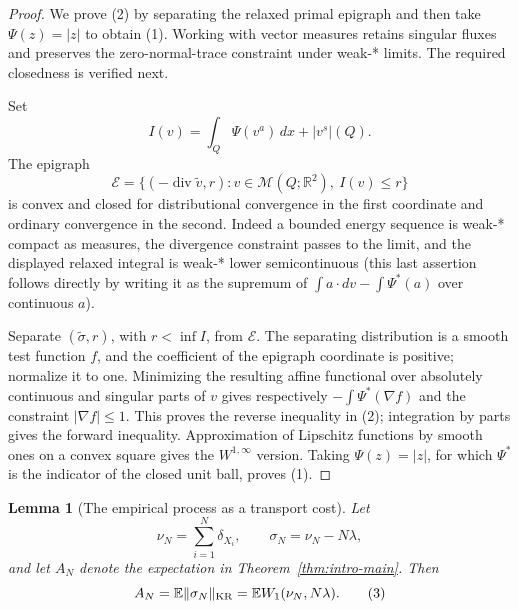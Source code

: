 \documentclass{aomart}
\newtheorem{lemma}[theorem]{Lemma}
\theoremstyle{definition}
\newcommand{\1}{\mathbf 1}
\begin{document}
\begin{proof}
We prove (2) by separating the relaxed primal epigraph and then take
$\Psi(z)=|z|$ to obtain (1).  Working with vector measures retains
singular fluxes and preserves the zero-normal-trace constraint under
weak-* limits.  The required closedness is verified next.

Set
\begin{equation*}
I(v)=\int_ Q\Psi(v^a)\,dx+|v^s|(Q).
\end{equation*}
The epigraph
\begin{equation*}
\mathscr E=\{(-\operatorname {div}\widetilde v,r):
v\in\mathcal M(Q;\mathbb R^2),\ I(v)\leq r\}
\end{equation*}
is convex and closed for distributional convergence in the first
coordinate and ordinary convergence in the second.  Indeed a bounded
energy sequence is weak-* compact as measures, the divergence constraint
passes to the limit, and the displayed relaxed integral is weak-* lower
semicontinuous (this last assertion follows directly by writing it as
the supremum of $\int a\cdot dv-\int\Psi^*(a)$ over continuous
$a$).

Separate $(\widetilde\sigma,r)$, with $r<\inf I$, from
$\mathscr E$.  The separating distribution is a smooth test function
$f$, and the coefficient of the epigraph coordinate is positive;
normalize it to one.  Minimizing the resulting affine functional over
absolutely continuous and singular parts of $v$ gives respectively
$-\int\Psi^*(\nabla f)$ and the constraint $|\nabla f|\leq1$.
This proves the reverse inequality in (2); integration by parts gives
the forward inequality.  Approximation of Lipschitz functions by smooth
ones on a convex square gives the $W^{1,\infty}$ version.  Taking
$\Psi(z)=|z|$, for which $\Psi^*$ is the indicator of the closed unit
ball, proves (1).

\end{proof}

\begin{lemma}[The empirical process as a transport cost]\label{lem:empirical-transport}
Let
\begin{equation*}
\nu_ N=\sum_ {i=1}^N\delta_ {X_ i},\qquad \sigma_ N=\nu_ N-N\lambda,
\end{equation*}
and let $A_ N$ denote the expectation in Theorem~\ref{thm:intro-main}. Then
\begin{equation}
A_ N=\mathbb E\|\sigma_ N\|_ {\rm KR}
=\mathbb E W_ 1(\nu_ N,N\lambda).
\tag{3}
\end{equation}

\end{lemma}
\end{document}
